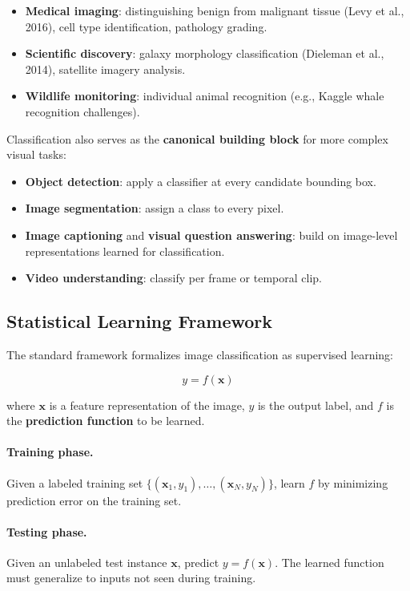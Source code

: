 \documentclass[11pt,a4paper]{article}
\theoremstyle{definition}
\theoremstyle{plain}
\theoremstyle{remark}
\begin{document}
\begin{itemize}
    \item \textbf{Medical imaging}: distinguishing benign from malignant tissue (Levy et al., 2016), cell type identification, pathology grading.
    \item \textbf{Scientific discovery}: galaxy morphology classification (Dieleman et al., 2014), satellite imagery analysis.
    \item \textbf{Wildlife monitoring}: individual animal recognition (e.g., Kaggle whale recognition challenges).
\end{itemize}

Classification also serves as the \textbf{canonical building block} for more complex visual tasks:
\begin{itemize}
    \item \textbf{Object detection}: apply a classifier at every candidate bounding box.
    \item \textbf{Image segmentation}: assign a class to every pixel.
    \item \textbf{Image captioning} and \textbf{visual question answering}: build on image-level representations learned for classification.
    \item \textbf{Video understanding}: classify per frame or temporal clip.
\end{itemize}

\subsection{Statistical Learning Framework}

The standard framework formalizes image classification as supervised learning:

\[
    y = f(\mathbf{x})
\]

where $\mathbf{x}$ is a feature representation of the image, $y$ is the output label, and $f$ is the \textbf{prediction function} to be learned.

\paragraph{Training phase.} Given a labeled training set $\{(\mathbf{x}_1, y_1), \ldots, (\mathbf{x}_N, y_N)\}$, learn $f$ by minimizing prediction error on the training set.

\paragraph{Testing phase.} Given an unlabeled test instance $\mathbf{x}$, predict $y = f(\mathbf{x})$. The learned function must generalize to inputs not seen during training.
\end{document}
